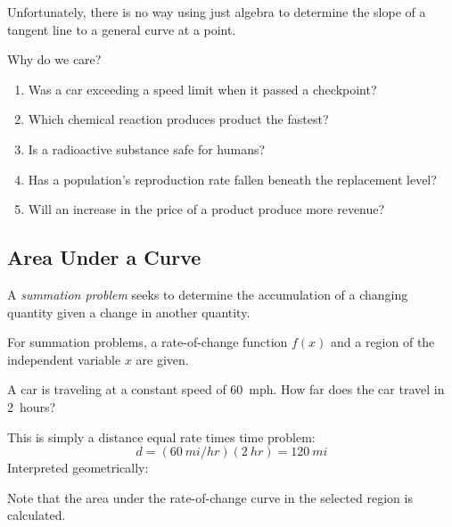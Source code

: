 \documentclass[letterpaper,12pt,fleqn]{article}
\begin{document}
Unfortunately, there is no way using just algebra to determine the slope of a tangent line to a general curve at a
point.

Why do we care?
\begin{enumerate}
\item Was a car exceeding a speed limit when it passed a checkpoint?
\item Which chemical reaction produces product the fastest?
\item Is a radioactive substance safe for humans?
\item Has a population's reproduction rate fallen beneath the replacement level?
\item Will an increase in the price of a product produce more revenue?
\end{enumerate}

\subsection*{Area Under a Curve}

\begin{definition}
  A \emph{summation problem} seeks to determine the accumulation of a changing quantity given a change in
  another quantity.
\end{definition}

For summation problems, a rate-of-change function \(f(x)\) and a region of the independent variable \(x\) are
given.

\begin{example}
  A car is traveling at a constant speed of \SI{60}{mph}.  How far does the car travel in \SI{2}{hours}?

  This is simply a distance equal rate times time problem:
  \[d=(\SI{60}{mi/hr})(\SI{2}{hr})=\SI{120}{mi}\]
  Interpreted geometrically:

  \bigskip

  \begin{center}
  \end{center}

  \bigskip

  Note that the area under the rate-of-change curve in the selected region is calculated.
\end{example}
\end{document}
